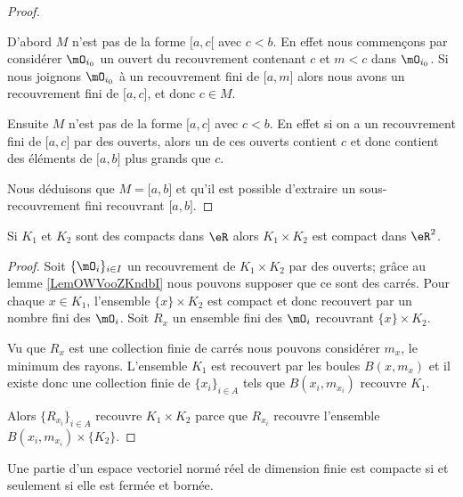 \begin{proof}
\begin{subproof}
        D'abord \( M\) n'est pas de la forme \( \mathopen[ a , c [\) avec \( c<b\). En effet nous commençons par considérer \( \mO_{i_0}\) un ouvert du recouvrement contenant \( c\) et \( m<c\) dans \( \mO_{i_0}\). Si nous joignons \( \mO_{i_0}\) à un recouvrement fini de \( \mathopen[ a , m \mathclose]\) alors nous avons un recouvrement fini de \( \mathopen[ a , c \mathclose]\), et donc \( c\in M\).

        Ensuite \( M\) n'est pas de la forme \( \mathopen[ a , c \mathclose]\) avec \( c<b\). En effet si on a un recouvrement fini de \( \mathopen[ a , c \mathclose]\) par des ouverts, alors un de ces ouverts contient \( c\) et donc contient des éléments de \( \mathopen[ a , b \mathclose]\) plus grands que \( c\).
    \end{subproof}
    Nous déduisons que \( M=\mathopen[ a , b \mathclose]\) et qu'il est possible d'extraire un sous-recouvrement fini recouvrant \( \mathopen[ a , b \mathclose]\).
\end{proof}

\begin{lemma}\label{LemCKBooXkwkte}
    Si \( K_1\) et \( K_2\) sont des compacts dans \( \eR\) alors \( K_1\times K_2\) est compact dans \( \eR^2\).
\end{lemma}

\begin{proof}
    Soit \( \{ \mO_i \}_{i\in I}\) un recouvrement de \( K_1\times K_2\) par des ouverts; grâce au lemme \ref{LemOWVooZKndbI} nous pouvons supposer que ce sont des carrés. Pour chaque \( x\in K_1\), l'ensemble \( \{ x \}\times K_2\) est compact et donc recouvert par un nombre fini des \( \mO_i\). Soit \( R_x\) un ensemble fini des \( \mO_i\) recouvrant \( \{ x \}\times K_2\).

    Vu que \( R_x\) est une collection finie de carrés nous pouvons considérer \( m_x\), le minimum des rayons. L'ensemble \( K_1\) est recouvert par les boules \( B(x,m_x)\) et il existe donc une collection finie de \( \{ x_i \}_{i\in A}\) tels que \( B(x_i,m_{x_i})\) recouvre \( K_1\).

    Alors \( \{ R_{x_i} \}_{i\in A}\) recouvre \( K_1\times K_2\) parce que \( R_{x_i}\) recouvre l'ensemble \( B(x_i,m_{x_i})\times \{ K_2 \}\).
\end{proof}

\begin{theorem} \label{ThoXTEooxFmdI}
    Une partie d'un espace vectoriel normé réel de dimension finie est compacte si et seulement si elle est fermée et bornée.
\end{theorem}

